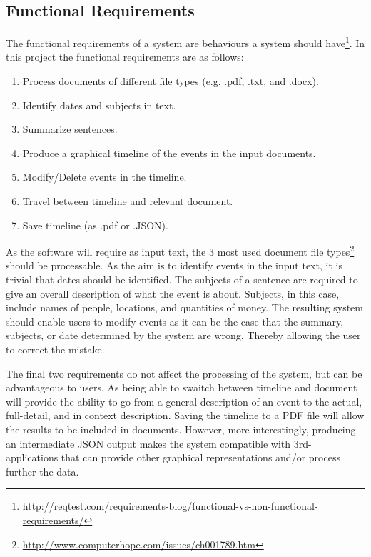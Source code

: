 \subsection{Functional Requirements}
\par The functional requirements of a system are behaviours a system should have\footnote{\url{http://reqtest.com/requirements-blog/functional-vs-non-functional-requirements/}}. In this project the functional requirements are as follows:
\begin{enumerate}
\item Process documents of different file types (e.g. .pdf, .txt, and .docx).
\item Identify dates and subjects in text.
\item Summarize sentences.
\item Produce a graphical timeline of the events in the input documents.
\item Modify/Delete events in the timeline.
\item Travel between timeline and relevant document.
\item Save timeline (as .pdf or .JSON).
\end{enumerate} 
\par As the software will require as input text, the 3 most used document file types\footnote{\url{http://www.computerhope.com/issues/ch001789.htm}} should be processable. As the aim is to identify events in the input text, it is trivial that dates should be identified. The subjects of a sentence are required to give an overall description of what the event is about. Subjects, in this case, include names of people, locations, and quantities of money. The resulting system should enable users to modify events as it can be the case that the summary, subjects, or date determined by the system are wrong. Thereby allowing the user to correct the mistake. 
\par The final two requirements do not affect the processing of the system, but can be advantageous to users. As being able to swaitch between timeline and document will provide the ability to go from a general description of an event to the actual, full-detail, and in context description. Saving the timeline to a PDF file will allow the results to be included in documents. However, more interestingly, producing an intermediate JSON output makes the system compatible with 3rd- applications that can provide other graphical representations and/or process further the data.

